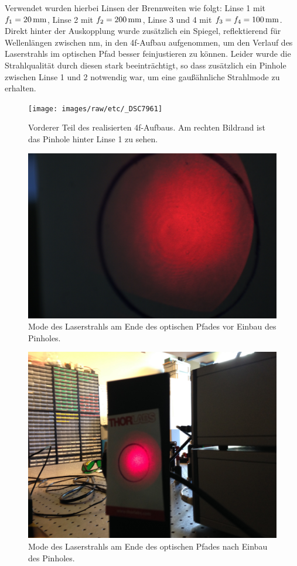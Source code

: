 Verwendet wurden hierbei Linsen der Brennweiten wie folgt: Linse 1 mit $f_{1}=\unit[20]{mm}$, Linse 2 mit $f_{2}=\unit[200]{mm}$, Linse 3 und 4 mit $f_{3}=f_{4}=\unit[100]{mm}$. Direkt hinter der Auskopplung wurde zusätzlich ein Spiegel, reflektierend für Wellenlängen zwischen \unit[400-700]{nm}, in den 4f-Aufbau aufgenommen, um den Verlauf des Laserstrahls im optischen Pfad besser feinjustieren zu können. Leider wurde die Strahlqualität durch diesen stark beeinträchtigt, so dass zusätzlich ein Pinhole zwischen Linse 1 und 2 notwendig war, um eine gaußähnliche Strahlmode zu erhalten.\\ 

\begin{figure}
\centering
\texttt{[image: images/raw/etc/\_DSC7961]}
\caption{Vorderer Teil des realisierten 4f-Aufbaus. Am rechten Bildrand ist das Pinhole hinter Linse 1 zu sehen.}
\label{fig:_DSC7961}
\end{figure}

\begin{figure}
\centering
\includegraphics[width=0.7\linewidth]{images/raw/etc/_DSC7988}
\caption{Mode des Laserstrahls am Ende des optischen Pfades vor Einbau des Pinholes.}
\label{fig:_DSC7988}
\end{figure}

\begin{figure}
\centering
\includegraphics[width=0.7\linewidth]{images/raw/etc/IMG_2223}
\caption{Mode des Laserstrahls am Ende des optischen Pfades nach Einbau des Pinholes.}
\label{fig:IMG_2223}
\end{figure}

